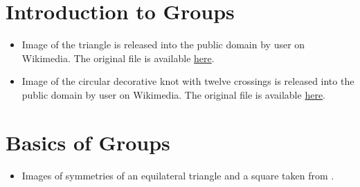 \section{Introduction to Groups}
\begin{itemize}
    \item Image of the triangle is released into the public domain by user  on Wikimedia. The original file is available \href{https://commons.wikimedia.org/wiki/File:Labeled_Triangle_Reflections.svg}{here}.
    \item Image of the circular decorative knot with twelve crossings is released into the public domain by user  on Wikimedia. The original file is available \href{https://commons.wikimedia.org/wiki/File:Circular-cross-decorative-knot-12crossings.svg}{here}.
\end{itemize}

\section{Basics of Groups}
\begin{itemize}
    \item Images of symmetries of an equilateral triangle and a square taken from \cite[p. 13]{milne_2021}.
\end{itemize}

\printbibliography[heading=bibintoc, title={References and Bibliography}]
\printindex


